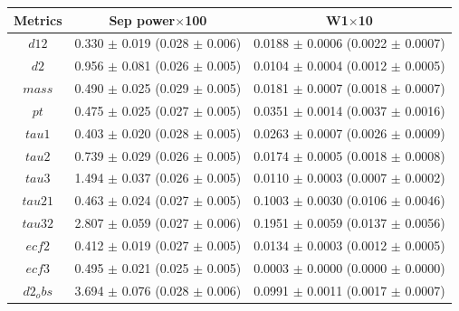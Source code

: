 \begin{ruledtabular}
  \begin{tabular}{ccc}
  \textbf{Metrics} & \textbf{Sep power}$\times$100 & \textbf{W1}$\times$10 \\
  \hline
  \textbf{$d12$} & 0.330 $\pm$ 0.019 (0.028 $\pm$ 0.006) & 0.0188 $\pm$ 0.0006 (0.0022 $\pm$ 0.0007) \\
  \textbf{$d2$} & 0.956 $\pm$ 0.081 (0.026 $\pm$ 0.005) & 0.0104 $\pm$ 0.0004 (0.0012 $\pm$ 0.0005) \\
  \textbf{$mass$} & 0.490 $\pm$ 0.025 (0.029 $\pm$ 0.005) & 0.0181 $\pm$ 0.0007 (0.0018 $\pm$ 0.0007) \\
  \textbf{$pt$} & 0.475 $\pm$ 0.025 (0.027 $\pm$ 0.005) & 0.0351 $\pm$ 0.0014 (0.0037 $\pm$ 0.0016) \\
  \textbf{$tau1$} & 0.403 $\pm$ 0.020 (0.028 $\pm$ 0.005) & 0.0263 $\pm$ 0.0007 (0.0026 $\pm$ 0.0009) \\
  \textbf{$tau2$} & 0.739 $\pm$ 0.029 (0.026 $\pm$ 0.005) & 0.0174 $\pm$ 0.0005 (0.0018 $\pm$ 0.0008) \\
  \textbf{$tau3$} & 1.494 $\pm$ 0.037 (0.026 $\pm$ 0.005) & 0.0110 $\pm$ 0.0003 (0.0007 $\pm$ 0.0002) \\
  \textbf{$tau21$} & 0.463 $\pm$ 0.024 (0.027 $\pm$ 0.005) & 0.1003 $\pm$ 0.0030 (0.0106 $\pm$ 0.0046) \\
  \textbf{$tau32$} & 2.807 $\pm$ 0.059 (0.027 $\pm$ 0.006) & 0.1951 $\pm$ 0.0059 (0.0137 $\pm$ 0.0056) \\
  \textbf{$ecf2$} & 0.412 $\pm$ 0.019 (0.027 $\pm$ 0.005) & 0.0134 $\pm$ 0.0003 (0.0012 $\pm$ 0.0005) \\
  \textbf{$ecf3$} & 0.495 $\pm$ 0.021 (0.025 $\pm$ 0.005) & 0.0003 $\pm$ 0.0000 (0.0000 $\pm$ 0.0000) \\
  \textbf{$d2_obs$} & 3.694 $\pm$ 0.076 (0.028 $\pm$ 0.006) & 0.0991 $\pm$ 0.0011 (0.0017 $\pm$ 0.0007) \\
  \end{tabular}
\end{ruledtabular}
